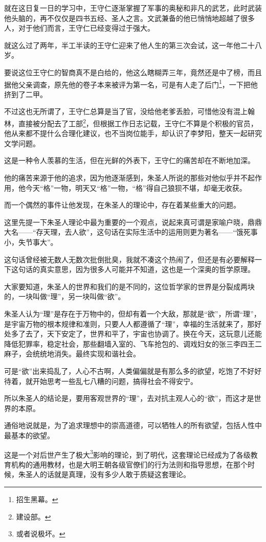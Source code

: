 \begin{multicols}{\theparacolNo}
就在这日复一日的学习中，王守仁逐渐掌握了军事的奥秘和非凡的武艺，此时武装他头脑的，再不仅仅是四书五经、圣人之言。文武兼备的他已悄悄地超越了很多人，对于他们而言，王守仁已经变得过于强大。

就这么过了两年，半工半读的王守仁迎来了他人生的第三次会试，这一年他二十八岁。

要说这位王守仁的智商真不是白给的，他这么瞎糊弄三年，竟然还是中了榜，而且据他父亲调查，原先他的卷子本来被评为第一名，可是有人走了后门\footnote{招生黑幕。}，一下把他挤到了二甲。

不过这也无所谓了，王守仁总算是当了官，没给他老爹丢脸，可惜他没有混上翰林，直接被分配去了工部\footnote{建设部。}，但根据工作日志记载，王守仁不算是个积极的官员，他从来都不提什么合理化建议，也不当岗位能手，却认识了李梦阳，整天一起研究文学问题。

这是一种令人羡慕的生活，但在光鲜的外表下，王守仁的痛苦却在不断地加深。

他的痛苦来源于他的追求，因为他逐渐感到，朱圣人所说的那些对他似乎并不起作用，他今天“格”一物，明天又“格”一物，“格”得自己狼狈不堪，却毫无收获。

而一个偶然的事件让他发现，在朱圣人的理论中，存在着某些重大的问题。

这里先提一下朱圣人理论中最为重要的一个观点，说起来真可谓是家喻户晓，鼎鼎大名——“存天理，去人欲”，这句话在实际生活中的运用则更为著名——“饿死事小，失节事大”。

这句话曾经被无数人无数次批倒批臭，我就不凑这个热闹了，但还是有必要解释一下这句话的真实意思，因为很多人可能并不知道，这也是一个深奥的哲学原理。

大家要知道，朱圣人的世界和我们的是不同的，这位哲学家的世界是分裂成两块的，一块叫做“理”，另一块叫做“欲”。

朱圣人认为“理”是存在于万物中的，但却有着一个大敌，那就是“欲”，所谓“理”，是宇宙万物的根本规律和准则，只要人人都遵循了“理”，幸福的生活就来了，那好处多了去了，天下安定了，世界和平了，宇宙也协调了。换在今天，这玩意儿还能降低犯罪率，稳定社会，那些翻墙入室的、飞车抢包的、调戏妇女的张三李四王二麻子，会统统地消失。最终实现和谐社会。

可是“欲”出来捣乱了，人心不古啊，人类偏偏就是有那么多的欲望，吃饱了不好好待着，就开始思考一些乱七八糟的问题，搞得社会不得安宁。

所以朱圣人的结论是，要用客观世界的“理”，去对抗主观人心的“欲”，而这才是世界的本原。

通俗地说就是，为了追求理想中的崇高道德，可以牺牲人的所有欲望，包括人性中最基本的欲望。

这是一个对后世产生了极大\footnote{或者说极坏。}影响的理论，到了明代，这套理论已经成为了各级教育机构的通用教材，也是大明王朝各级官僚们的行为法则和指导思想，在那个时候，朱圣人的话就是真理，没有多少人敢于质疑这套理论。


\end{multicols}

